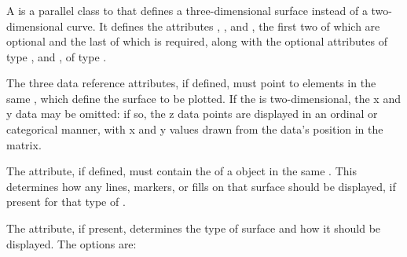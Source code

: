 \subsubsection{}
\label{class:surface}
\begin{blockChanged}
A \Surface is a parallel class to \AbstractCurve that defines a three-dimensional surface instead of a two-dimensional curve.  It defines the attributes , , and , the first two of which are optional and the last of which is required, along with the optional attributes  of type , and , of type \SurfaceKind.

The three data reference attributes, if defined, must point to \DataGenerator elements in the same \SedDocument, which define the surface to be plotted.  If the  is two-dimensional, the x and y data may be omitted: if so, the z data points are displayed in an ordinal or categorical manner, with x and y values drawn from the data's position in the matrix.

The  attribute, if defined, must contain the \SId of a \Style object in the same \SedDocument.  This \Style determines how any lines, markers, or fills on that surface should be displayed, if present for that type of \Surface.

The  attribute, if present, determines the type of surface and how it should be displayed.  The options are:


\end{blockChanged}
